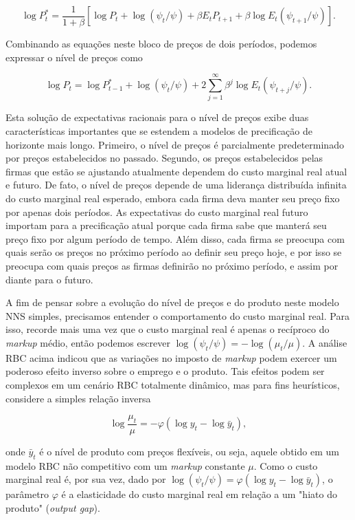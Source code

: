 \documentclass[12pt]{article}
\begin{document}
\begin{equation}
\log P_t^* = \frac{1}{1 + \beta} [ \log P_t + \log (\psi_t / \psi) + \beta E_t P_{t+1} + \beta \log E_t (\psi_{t+1} / \psi) ].
\end{equation}

Combinando as equações neste bloco de preços de dois períodos, podemos expressar o nível de preços como

\begin{equation}
\log P_t = \log P_{t-1}^* + \log (\psi_t/\psi) + 2 \sum_{j=1}^{\infty} \beta^j \log E_t (\psi_{t+j}/\psi). \tag{6.5}
\end{equation}

Esta solução de expectativas racionais para o nível de preços exibe duas características importantes que se estendem a modelos de precificação de horizonte mais longo. Primeiro, o nível de preços é parcialmente predeterminado por preços estabelecidos no passado. Segundo, os preços estabelecidos pelas firmas que estão se ajustando atualmente dependem do custo marginal real atual e futuro. De fato, o nível de preços depende de uma liderança distribuída infinita do custo marginal real esperado, embora cada firma deva manter seu preço fixo por apenas dois períodos. As expectativas do custo marginal real futuro importam para a precificação atual porque cada firma sabe que manterá seu preço fixo por algum período de tempo. Além disso, cada firma se preocupa com quais serão os preços no próximo período ao definir seu preço hoje, e por isso se preocupa com quais preços as firmas definirão no próximo período, e assim por diante para o futuro.

A fim de pensar sobre a evolução do nível de preços e do produto neste modelo NNS simples, precisamos entender o comportamento do custo marginal real. Para isso, recorde mais uma vez que o custo marginal real é apenas o recíproco do \textit{markup} médio, então podemos escrever $\log (\psi_t/\psi) = -\log (\mu_t/\mu)$. A análise RBC acima indicou que as variações no imposto de \textit{markup} podem exercer um poderoso efeito inverso sobre o emprego e o produto. Tais efeitos podem ser complexos em um cenário RBC totalmente dinâmico, mas para fins heurísticos, considere a simples relação inversa

\begin{equation}
\log \frac{\mu_t}{\mu} = -\varphi (\log y_t - \log \bar{y}_t), \tag{6.6}
\end{equation}

onde $\bar{y}_t$ é o nível de produto com preços flexíveis, ou seja, aquele obtido em um modelo RBC não competitivo com um \textit{markup} constante $\mu$. Como o custo marginal real é, por sua vez, dado por $\log(\psi_t/\psi) = \varphi(\log y_t - \log \bar{y}_t)$, o parâmetro $\varphi$ é a elasticidade do custo marginal real em relação a um "hiato do produto" (\textit{output gap}).
\end{document}
